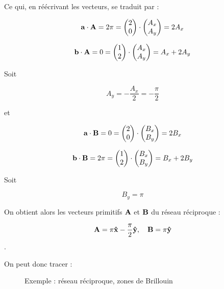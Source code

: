 Ce qui, en réécrivant les vecteurs, se traduit par :

\begin{equation*}
\mathbf{a} \cdot \mathbf{A} = 2\pi = \begin{pmatrix} 2 \\0 \end{pmatrix}\cdot\begin{pmatrix} A_x \\ A_y \end{pmatrix} = 2A_x
\end{equation*}

\begin{equation*}
\mathbf{b} \cdot \mathbf{A} = 0 = \begin{pmatrix} 1 \\2 \end{pmatrix}\cdot\begin{pmatrix} A_x \\ A_y \end{pmatrix} = A_x + 2A_y
\end{equation*}

Soit

\begin{equation*}
A_y = -\frac{A_x}{2} = -\frac{\pi}{2}
\end{equation*}

et

\begin{equation*}
\mathbf{a} \cdot \mathbf{B} = 0 = \begin{pmatrix} 2 \\0 \end{pmatrix}\cdot\begin{pmatrix} B_x \\ B_y \end{pmatrix} = 2B_x
\end{equation*}

\begin{equation*}
\mathbf{b} \cdot \mathbf{B} = 2\pi = \begin{pmatrix} 1 \\2 \end{pmatrix}\cdot\begin{pmatrix} B_x \\ B_y \end{pmatrix} = B_x + 2B_y
\end{equation*}


Soit

\begin{equation*}
B_y = \pi
\end{equation*}

On obtient alors les vecteurs primitifs $\mathbf{A}$ et $\mathbf{B}$ du réseau réciproque :

\begin{equation}
\mathbf{A} = \pi\mathbf{\hat{x}}-\frac{\pi}{2}\mathbf{\hat{y}},\quad \mathbf{B} = \pi \mathbf{\hat{y}}
\end{equation}.

On peut donc tracer :

\begin{figure}
\TODO
\caption{Exemple : réseau réciproque, zones de Brillouin}
\label{fig:exemplebrillouin}
\end{figure}
